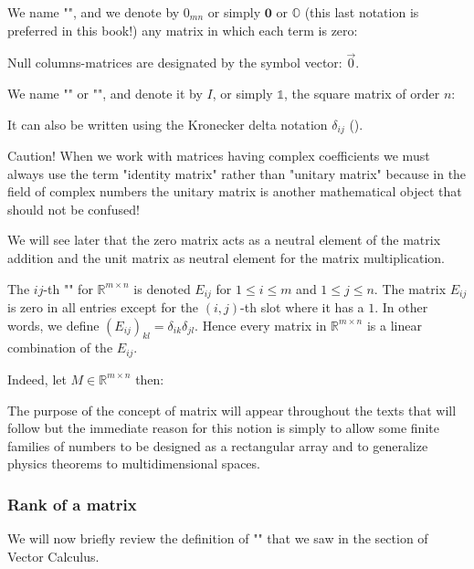 	We name "", and we denote by $0_{mn}$ or simply $\mathbf{0}$ or $\mathds{O}$ (this last notation is preferred in this book!) any matrix in which each term is zero:
		
	Null columns-matrices are designated by the symbol vector: $\vec{0}$.
	
	We name "" or "", and denote it by $I$, or simply $\mathds{1}$, the square matrix of order $n$:
	
	It can also be written using the Kronecker delta notation $\delta_{ij}$ ().
	
	\begin{tcolorbox}[colback=red!5,borderline={1mm}{2mm}{red!5},arc=0mm,boxrule=0pt]
	\bcbombe Caution! When we work with matrices having complex coefficients we must always use the term "identity matrix" rather than "unitary matrix" because in the field of complex numbers the unitary matrix is another mathematical object that should not be confused!
	\end{tcolorbox}

	We will see later that the zero matrix acts as a neutral element of the matrix addition and the unit matrix as neutral element for the matrix multiplication.
	
	The $ij$-th "" for $\mathbb{R}^{m\times n}$ is denoted $E_{ij}$ for $1\leq i \leq m$ and $1\leq j\leq n$. The matrix $E_{ij}$ is zero in all entries except for the $(i,j)$-th slot where it has a $1$. In other words, we define $(E_{ij})_{kl}=\delta_{ik}\delta_{jl}$. Hence every matrix in $\mathbb{R}^{m\times n}$ is a linear combination of the $E_{ij}$. 
	
	Indeed, let $M\in \mathbb{R}^{m\times n}$ then:
	
	
	The purpose of the concept of matrix will appear throughout the texts that will follow but the immediate reason for this notion is simply to allow some finite families of numbers to be designed as a rectangular array and to generalize physics theorems to multidimensional spaces.
	
	\subsubsection{Rank of a matrix}\label{rank of a matrix}
	We will now briefly review the definition of "" that we saw in the section of Vector Calculus.
	
